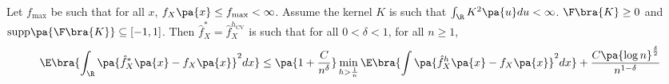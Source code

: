\begin{theorem}[Dalelane 05]\label{thm:dalelane}
  Let $f_{\max}$ be such that for all $x$, $f_X\pa{x}\leq f_{\max} <\infty$. Assume the kernel $K$ is such that
  $\int_\R K^2\pa{u}du<\infty$. $\F\bra{K}\geq 0$ and $\mathrm{supp}\pa{\F\bra{K}}\subseteq [-1,1]$. Then $\hat{f}_X^\ast = \hat{f}_X^{h_{\mathrm{CV}}}$ is such that for all $0<\delta <1$, for all $n\geq 1$,
  \begin{equation}
    \E\bra{\int_\R \pa{\hat{f}^\ast_X \pa{x} - f_X\pa{x}}^2dx} \leq \pa{1+\frac{C}{n^\delta}} \min_{h>\frac{1}{n}} \E\bra{\int \pa{\hat{f}_X^h\pa{x} - f_X\pa{x}}^2 dx} + \frac{C\pa{\log n}^{\frac{\delta}{2}}}{n^{1-\delta}}
  \end{equation}
\end{theorem}
%
